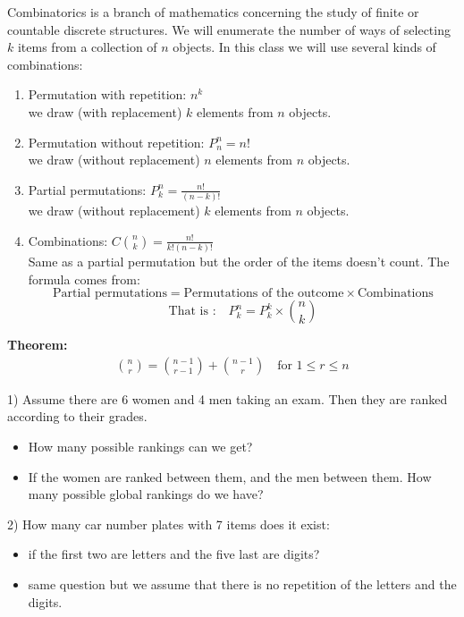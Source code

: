 \documentclass[12pt,a4paper,titlepage]{article}
\begin{document}
Combinatorics is a branch of mathematics concerning the study of finite or countable discrete structures.
We will enumerate the number of ways of selecting $k$ items from a collection of $n$ objects.
In this class we will use several kinds of combinations:
\begin{enumerate}
  \item Permutation with repetition: $n^k$  \\
  we draw (with replacement) $k$ elements from $n$ objects.
  \item Permutation without repetition: $P^n_n=n!$ \\
  we draw (without replacement) $n$ elements from $n$ objects.
  \item Partial permutations: $P^n_k=\frac{n!}{(n-k)!}$ \\
  we draw (without replacement) $k$ elements from $n$ objects.
  \item Combinations: $C{n \choose k}=\frac{n!}{k!(n-k)!}$ \\
  Same as a partial permutation but the order of the items doesn't count.
  The formula comes from:
  $$ \text{Partial permutations}= \text{Permutations of the outcome} \times \text{Combinations}$$
$$ \text{That is :} \quad P^n_k=P^k_k \times {n \choose k} $$
\end{enumerate}

\textbf{Theorem:}
\begin{align}
{n \choose r}={n-1 \choose r-1}+{n-1 \choose r} \quad \text{for } 1\leq r\leq n
\end{align}

\vspace{1cm}

1) Assume there are 6 women and 4 men taking an exam. Then they are ranked according to their grades.
\begin{itemize}
  \item How many possible rankings can we get?
  \item If the women are ranked between them, and the men between them. How many possible global rankings do we have?
\end{itemize}

2) How many car number plates with 7 items does it exist:
\begin{itemize}
  \item if the first two are letters and the five last are digits?
  \item same question but we assume that there is no repetition of the letters and the digits.
\end{itemize}
\end{document}
